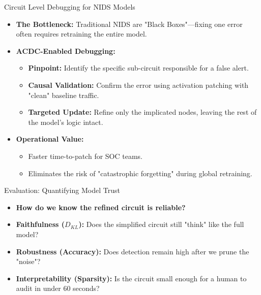 \documentclass{beamer}
\begin{document}
	\begin{frame}{Circuit Level Debugging for NIDS Models}
		\begin{itemize}
			\item \textbf{The Bottleneck:} Traditional NIDS are "Black Boxes"—fixing one error often requires retraining the entire model.
			
			\vspace{0.6em}
			
			\item \textbf{ACDC-Enabled Debugging:}
			\begin{itemize}
				\item \textbf{Pinpoint:} Identify the specific sub-circuit responsible for a false alert.
				\item \textbf{Causal Validation:} Confirm the error using activation patching with "clean" baseline traffic.
				\item \textbf{Targeted Update:} Refine only the implicated nodes, leaving the rest of the model's logic intact.
			\end{itemize}
			
			\vspace{0.6em}
			
			\item \textbf{Operational Value:} 
			\begin{itemize}
				\item Faster time-to-patch for SOC teams.
				\item Eliminates the risk of "catastrophic forgetting" during global retraining.
			\end{itemize}
		\end{itemize}
	\end{frame}
	
	\begin{frame}{Evaluation: Quantifying Model Trust}
		\begin{itemize}
			\item \textbf{How do we know the refined circuit is reliable?}
			\vspace{0.8em}
			\item \textbf{Faithfulness ($D_{KL}$):} Does the simplified circuit still "think" like the full model?
			\item \textbf{Robustness (Accuracy):} Does detection remain high after we prune the "noise"?
			\item \textbf{Interpretability (Sparsity):} Is the circuit small enough for a human to audit in under 60 seconds? \tiny \cite{conmy2023acdc}
			
		\end{itemize}
	\end{frame}
	
\end{document}
